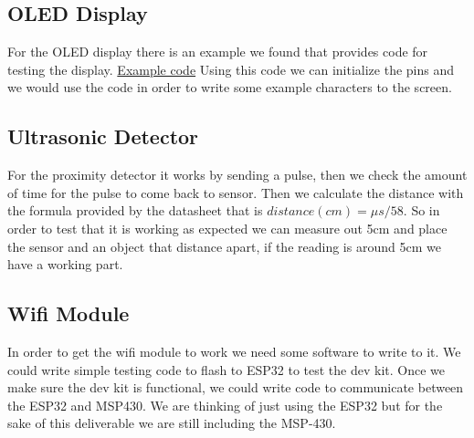 \documentclass{article}
\begin{document}
\subsection{OLED Display}
For the OLED display there is an example we found that provides code for testing the display. \href{https://github.com/sdp8483/MSP430G2_SSD1306_OLED/blob/master/MSP430G2_SSD1306/i2c.c}{Example code} Using this code we can initialize the pins and we would use the code in order to write some example characters to the screen.
\subsection{Ultrasonic Detector}
For the proximity detector it works by sending a pulse, then we check the amount of time for the pulse to come back to sensor. Then we calculate the distance with the formula provided by the datasheet that is $distance(cm) = \mu s /58$. So in order to test that it is working as expected we can measure out 5cm and place the sensor and an object that distance apart, if the reading is around 5cm we have a working part.
\subsection{Wifi Module}
In order to get the wifi module to work we need some software to write to it. We could write simple testing code to flash to ESP32 to test the dev kit. Once we make sure the dev kit is functional, we could write code to communicate between the ESP32 and MSP430. We are thinking of just using the ESP32 but for the sake of this deliverable we are still including the MSP-430.
\end{document}
